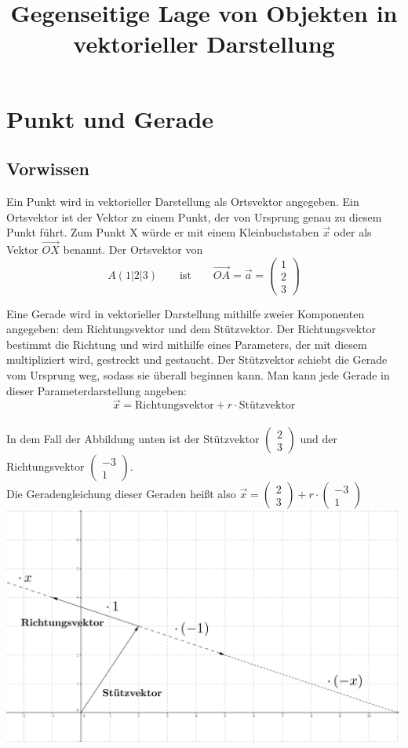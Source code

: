 \documentclass[10pt,a4paper,twoside,fleqn]{article}
\newcommand{\Vektor}[2]{\begin{pmatrix} #1 \\ #2 \end{pmatrix}}
\newcommand{\vektor}[3] {\begin{pmatrix} #1 \\ #2 \\ #3 \end{pmatrix}}
\begin{document}
	\author{} \date{}
	\title{Gegenseitige Lage von Objekten in vektorieller Darstellung}
	\maketitle
	


		\section{Punkt und Gerade}
		\subsection{Vorwissen}
			Ein Punkt wird in vektorieller Darstellung als Ortsvektor angegeben. Ein Ortsvektor ist der Vektor zu einem Punkt, der von Ursprung genau zu diesem Punkt führt. Zum Punkt X würde er mit einem Kleinbuchstaben $\vec{x}$ oder als Vektor $\vec{OX}$ benannt. 
			Der Ortsvektor von $$ A(1|2|3) \qquad \text{ist} \qquad \vec{OA}=\vec{a}=\vektor{1}{2}{3}$$
			
			
			Eine Gerade wird in vektorieller Darstellung mithilfe zweier Komponenten angegeben: dem Richtungsvektor und dem Stützvektor. Der Richtungsvektor bestimmt die Richtung und wird mithilfe eines Parameters, der mit diesem multipliziert wird, gestreckt und gestaucht. Der Stützvektor schiebt die Gerade vom Ursprung weg, sodass sie überall beginnen kann. Man kann jede Gerade in dieser Parameterdarstellung angeben: $$\vec{x} = \text{Richtungsvektor} + r \cdot \text{Stützvektor}$$ \\
		\bigskip
			In dem Fall der Abbildung unten ist der Stützvektor $\Vektor{2}{3}$ und der Richtungsvektor $\Vektor{-3}{1}$. \\ Die Geradengleichung dieser Geraden heißt also $\vec{x}=\Vektor{2}{3} + r\cdot\Vektor{-3}{1}$\\
			\medskip
			\includegraphics[keepaspectratio,width=\linewidth]{Gerade.png}
		\newpage		
\end{document}
